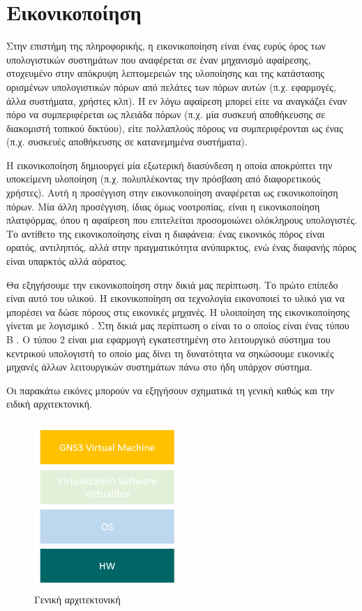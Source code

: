 \section{Εικονικοποίηση}
Στην επιστήμη της πληροφορικής, η εικονικοποίηση  είναι ένας ευρύς όρος 
των υπολογιστικών συστημάτων που αναφέρεται σε έναν μηχανισμό αφαίρεσης, 
στοχευμένο στην απόκρυψη λεπτομερειών της υλοποίησης και της κατάστασης
ορισμένων υπολογιστικών πόρων από πελάτες των πόρων αυτών 
(π.χ. εφαρμογές, άλλα συστήματα, χρήστες κλπ). 
Η εν λόγω αφαίρεση μπορεί είτε να αναγκάζει έναν πόρο να 
συμπεριφέρεται ως πλειάδα πόρων (π.χ. μία συσκευή αποθήκευσης σε διακομιστή τοπικού δικτύου),
είτε πολλαπλούς πόρους να συμπεριφέρονται ως ένας (π.χ. συσκευές αποθήκευσης σε κατανεμημένα συστήματα). 

Η εικονικοποίηση δημιουργεί μία εξωτερική διασύνδεση η οποία αποκρύπτει την 
υποκείμενη υλοποίηση (π.χ. πολυπλέκοντας την πρόσβαση από διαφορετικούς χρήστες).
Αυτή η προσέγγιση στην εικονικοποίηση αναφέρεται ως εικονικοποίηση πόρων. 
Μία άλλη προσέγγιση, ίδιας όμως νοοτροπίας, είναι η εικονικοποίηση πλατφόρμας,
όπου η αφαίρεση που επιτελείται προσομοιώνει ολόκληρους υπολογιστές. Το αντίθετο της εικονικοποίησης είναι η διαφάνεια: 
ένας εικονικός πόρος είναι ορατός, αντιληπτός, αλλά στην πραγματικότητα ανύπαρκτος, 
ενώ ένας διαφανής πόρος είναι υπαρκτός αλλά αόρατος. 
 
Θα εξηγήσουμε την εικονικοποίηση στην δικιά μας περίπτωση. Το πρώτο επίπεδο είναι αυτό του υλικού. Η εικονικοποίηση
σα τεχνολογία εικονοποιεί το υλικό για να μπορέσει να δώσε πόρους στις εικονικές μηχανές. Η υλοιποίηση
της εικονικοποίησης γίνεται με λογισμικό . Στη δικιά μας περίπτωση ο  είναι 
το  ο οποίος είναι ένας τύπου Β . Ο  τύπου 2 είναι μια εφαρμογή εγκατεστημένη 
στο λειτουργικό σύστημα του κεντρικού υπολογιστή το οποίο μας δίνει τη δυνατότητα να σηκώσουμε 
εικονικές μηχανές άλλων λειτουργικών συστημάτων πάνω στο ήδη υπάρχον σύστημα.

Οι παρακάτω εικόνες μπορούν να εξηγήσουν σχηματικά τη γενική καθώς και την ειδική αρχιτεκτονική.

\begin{figure}[htb]
	\centering
	\includegraphics[width=0.5\textwidth]{graphics/Architecture_virtualbox.PNG}
	\caption{ Γενική αρχιτεκτονική}
\end{figure}

